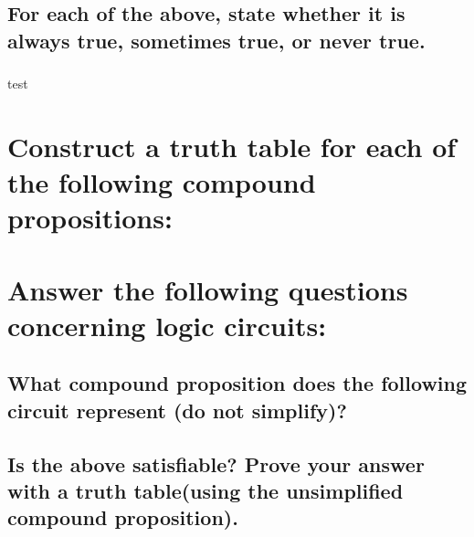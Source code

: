 \documentclass{article}
\begin{document}
    \subsection{For each of the above, state whether it is always true, sometimes true, or never true.} 
    \subsubsection{}test

\section{Construct a truth table for each of the following compound propositions:}
    \subsection{} 
    \subsection{} 

\section{Answer the following questions concerning logic circuits:}
    \subsection{What compound proposition does the following circuit represent (do not simplify)?} 
    \subsection{Is the above satisfiable? Prove your answer with a truth table(using the unsimplified compound proposition).} 
\end{document}

